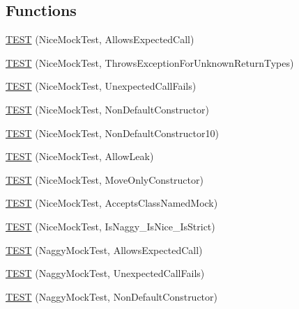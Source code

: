 \subsection*{Functions}
\begin{DoxyCompactItemize}
\item 
\mbox{\hyperlink{namespacetesting_1_1gmock__nice__strict__test_a12b9f686345faa5a646da65a67c38a44}{T\+E\+ST}} (Nice\+Mock\+Test, Allows\+Expected\+Call)
\item 
\mbox{\hyperlink{namespacetesting_1_1gmock__nice__strict__test_af6a34a561886bec5e278239ef65d6011}{T\+E\+ST}} (Nice\+Mock\+Test, Throws\+Exception\+For\+Unknown\+Return\+Types)
\item 
\mbox{\hyperlink{namespacetesting_1_1gmock__nice__strict__test_a2bad58b3a12ea95eb4a731026c576b40}{T\+E\+ST}} (Nice\+Mock\+Test, Unexpected\+Call\+Fails)
\item 
\mbox{\hyperlink{namespacetesting_1_1gmock__nice__strict__test_a4172e1193c21d61e34d9b2c379d2f6be}{T\+E\+ST}} (Nice\+Mock\+Test, Non\+Default\+Constructor)
\item 
\mbox{\hyperlink{namespacetesting_1_1gmock__nice__strict__test_a81bfeea94824935648545225f5dd3c00}{T\+E\+ST}} (Nice\+Mock\+Test, Non\+Default\+Constructor10)
\item 
\mbox{\hyperlink{namespacetesting_1_1gmock__nice__strict__test_a49fd5610815a7ced633a1c8ac3f62709}{T\+E\+ST}} (Nice\+Mock\+Test, Allow\+Leak)
\item 
\mbox{\hyperlink{namespacetesting_1_1gmock__nice__strict__test_ade923493d5669e4ae63e1dd6a7e3d92d}{T\+E\+ST}} (Nice\+Mock\+Test, Move\+Only\+Constructor)
\item 
\mbox{\hyperlink{namespacetesting_1_1gmock__nice__strict__test_a0a43059a52437e547c8fb836008b8e60}{T\+E\+ST}} (Nice\+Mock\+Test, Accepts\+Class\+Named\+Mock)
\item 
\mbox{\hyperlink{namespacetesting_1_1gmock__nice__strict__test_a94dd6c20e30f88457f7d9a583881be5a}{T\+E\+ST}} (Nice\+Mock\+Test, Is\+Naggy\+\_\+\+Is\+Nice\+\_\+\+Is\+Strict)
\item 
\mbox{\hyperlink{namespacetesting_1_1gmock__nice__strict__test_a8ae416186af77fc0d066467be92c6c86}{T\+E\+ST}} (Naggy\+Mock\+Test, Allows\+Expected\+Call)
\item 
\mbox{\hyperlink{namespacetesting_1_1gmock__nice__strict__test_a475ee57b7b86f3f81d50819db3dd78b4}{T\+E\+ST}} (Naggy\+Mock\+Test, Unexpected\+Call\+Fails)
\item 
\mbox{\hyperlink{namespacetesting_1_1gmock__nice__strict__test_a9618de98b38e8e4270873d9b2616e3e1}{T\+E\+ST}} (Naggy\+Mock\+Test, Non\+Default\+Constructor)

\end{DoxyCompactItemize}
